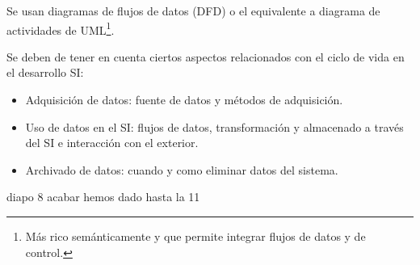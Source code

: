 \documentclass[12pt]{report} %
\providecommand{\tightlist}{%
  \setlength{\itemsep}{0pt}\setlength{\parskip}{0pt}}
\begin{document}
Se usan diagramas de flujos de datos (DFD) o el equivalente a diagrama
de actividades de
UML\footnote{Más rico semánticamente y que permite integrar flujos de datos y de control.}.

Se deben de tener en cuenta ciertos aspectos relacionados con el ciclo
de vida en el desarrollo SI:

\begin{itemize}
\tightlist
\item
  Adquisición de datos: fuente de datos y métodos de adquisición.
\item
  Uso de datos en el SI: flujos de datos, transformación y almacenado a
  través del SI e interacción con el exterior.
\item
  Archivado de datos: cuando y como eliminar datos del sistema.
\end{itemize}

diapo 8 acabar hemos dado hasta la 11


\end{document}
